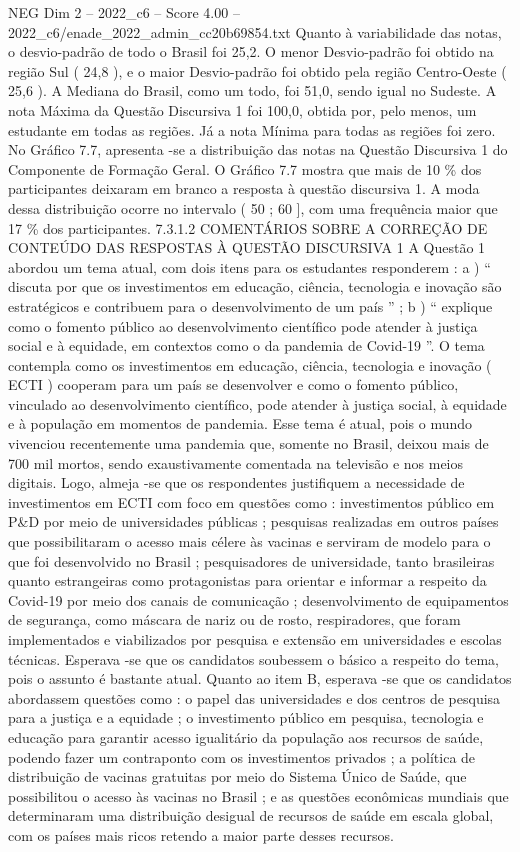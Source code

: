 \begin{textsample}{NEG Dim 2 – 2022\_c6 – Score 4.00 – 2022\_c6/enade\_2022\_admin\_cc20b69854.txt}
Quanto à variabilidade das notas, o desvio-padrão de todo o Brasil foi 25,2.
O menor Desvio-padrão foi obtido na região Sul ( 24,8 ), e o maior Desvio-padrão foi obtido pela região Centro-Oeste ( 25,6 ).
A Mediana do Brasil, como um todo, foi 51,0, sendo igual no Sudeste.
A nota Máxima da Questão Discursiva 1 foi 100,0, obtida por, pelo menos, um estudante em todas as regiões.
Já a nota Mínima para todas as regiões foi zero.
No Gráfico 7.7, apresenta -se a distribuição das notas na Questão Discursiva 1 do Componente de Formação Geral.
O Gráfico 7.7 mostra que mais de 10 \% dos participantes deixaram em branco a resposta à questão discursiva 1.
A moda dessa distribuição ocorre no intervalo ( 50 ; 60 ], com uma frequência maior que 17 \% dos participantes. 7.3.1.2 COMENTÁRIOS SOBRE A CORREÇÃO DE CONTEÚDO DAS RESPOSTAS À QUESTÃO DISCURSIVA 1 A Questão 1 abordou um tema atual, com dois itens para os estudantes responderem : a ) “ discuta por que os investimentos em educação, ciência, tecnologia e inovação são estratégicos e contribuem para o desenvolvimento de um país ” ; b ) “ explique como o fomento público ao desenvolvimento científico pode atender à justiça social e à equidade, em contextos como o da pandemia de Covid-19 ”.
O tema contempla como os investimentos em educação, ciência, tecnologia e inovação ( ECTI ) cooperam para um país se desenvolver e como o fomento público, vinculado ao desenvolvimento científico, pode atender à justiça social, à equidade e à população em momentos de pandemia.
Esse tema é atual, pois o mundo vivenciou recentemente uma pandemia que, somente no Brasil, deixou mais de 700 mil mortos, sendo exaustivamente comentada na televisão e nos meios digitais.
Logo, almeja -se que os respondentes justifiquem a necessidade de investimentos em ECTI com foco em questões como : investimentos público em P\&D por meio de universidades públicas ; pesquisas realizadas em outros países que possibilitaram o acesso mais célere às vacinas e serviram de modelo para o que foi desenvolvido no Brasil ; pesquisadores de universidade, tanto brasileiras quanto estrangeiras como protagonistas para orientar e informar a respeito da Covid-19 por meio dos canais de comunicação ; desenvolvimento de equipamentos de segurança, como máscara de nariz ou de rosto, respiradores, que foram implementados e viabilizados por pesquisa e extensão em universidades e escolas técnicas.
Esperava -se que os candidatos soubessem o básico a respeito do tema, pois o assunto é bastante atual.
Quanto ao item B, esperava -se que os candidatos abordassem questões como : o papel das universidades e dos centros de pesquisa para a justiça e a equidade ; o investimento público em pesquisa, tecnologia e educação para garantir acesso igualitário da população aos recursos de saúde, podendo fazer um contraponto com os investimentos privados ; a política de distribuição de vacinas gratuitas por meio do Sistema Único de Saúde, que possibilitou o acesso às vacinas no Brasil ; e as questões econômicas mundiais que determinaram uma distribuição desigual de recursos de saúde em escala global, com os países mais ricos retendo a maior parte desses recursos.

\end{textsample}
